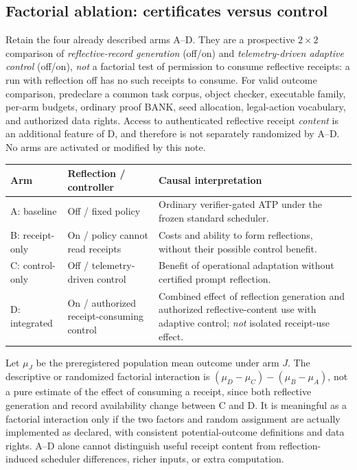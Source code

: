 \documentclass[11pt,letterpaper]{article}
\begin{document}
\subsection{Factorial ablation: certificates versus control}
Retain the four already described arms A--D. They are a prospective $2\times2$ comparison of \emph{reflective-record generation} (off/on) and \emph{telemetry-driven adaptive control} (off/on), \emph{not} a factorial test of permission to consume reflective receipts: a run with reflection off has no such receipts to consume. For valid outcome comparison, predeclare a common task corpus, object checker, executable family, per-arm budgets, ordinary proof BANK, seed allocation, legal-action vocabulary, and authorized data rights. Access to authenticated reflective receipt \emph{content} is an additional feature of D, and therefore is not separately randomized by A--D. No arms are activated or modified by this note.
\begin{center}
\small
\begin{tabularx}{\linewidth}{@{}p{24mm}p{34mm}X@{}}
\toprule
Arm & Reflection / controller & Causal interpretation\\
\midrule
A: baseline & Off / fixed policy & Ordinary verifier-gated ATP under the frozen standard scheduler.\\
B: receipt-only & On / policy cannot read receipts & Costs and ability to form reflections, without their possible control benefit.\\
C: control-only & Off / telemetry-driven control & Benefit of operational adaptation without certified prompt reflection.\\
D: integrated & On / authorized receipt-consuming control & Combined effect of reflection generation and authorized reflective-content use with adaptive control; \emph{not} isolated receipt-use effect.\\
\bottomrule
\end{tabularx}
\end{center}
Let $\mu_J$ be the preregistered population mean outcome under arm $J$. The descriptive or randomized factorial interaction is $(\mu_D-\mu_C)-(\mu_B-\mu_A)$, not a pure estimate of the effect of consuming a receipt, since both reflective generation and record availability change between C and D. It is meaningful as a factorial interaction only if the two factors and random assignment are actually implemented as declared, with consistent potential-outcome definitions and data rights. A--D alone cannot distinguish useful receipt content from reflection-induced scheduler differences, richer inputs, or extra computation.
\end{document}
